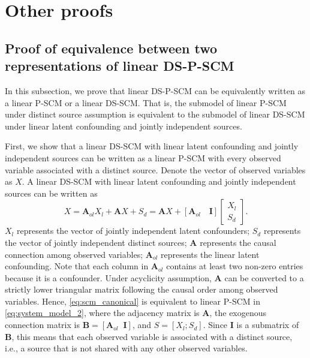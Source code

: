 \documentclass[12pt]{article}
\newcommand{\bA}{\mathbf{A}}
\newcommand{\bB}{\mathbf{B}}
\newcommand{\bI}{\mathbf{I}}
\begin{document}
\section{Other proofs}\label{app:other_proofs}
\subsection{Proof of equivalence between two representations of linear DS-P-SCM} \label{app:proof_equiv_nondeter}

In this subsection, we prove that linear DS-P-SCM can be equivalently written as a linear P-SCM or a linear DS-SCM. That is, the submodel of linear P-SCM under distinct source assumption is equivalent to the submodel of linear DS-SCM under linear latent confounding and jointly independent sources. 

First, we show that a linear DS-SCM with linear latent confounding and jointly independent sources can be written as a linear P-SCM with every observed variable associated with a distinct source. Denote the vector of observed variables as $X$. A linear DS-SCM with linear latent confounding and jointly independent sources can be written as 
\begin{equation}
X =\bA_{ol}X_{l} + \bA X + S_d = \bA X + [\bA_{ol}\quad \bI] 
\begin{bmatrix}
X_{l} \\
S_d
\end{bmatrix}.
\label{eq:scm_canonical}
\end{equation}
$X_l$ represents the vector of jointly independent latent confounders; $S_d$ represents the vector of jointly independent distinct sources; $\bA$ represents the causal connection among observed variables; $\bA_{ol}$ represents the linear latent confounding. Note that each column in $\bA_{ol}$ contains at least two non-zero entries because it is a confounder. Under acyclicity assumption, $\bA$ can be converted to a strictly lower triangular matrix following the causal order among observed variables.
Hence, \eqref{eq:scm_canonical} is equivalent to linear P-SCM in \eqref{eq:system_model_2}, where the adjacency matrix is $\bA$, the exogenous connection matrix is $\bB=[\bA_{ol}\;\; \bI]$, and $S=[X_l; S_d]$. Since $\bI$ is a submatrix of $\bB$, this means that each observed variable is associated with a distinct source, i.e., a source that is not shared with any other observed variables. 

\end{document}
